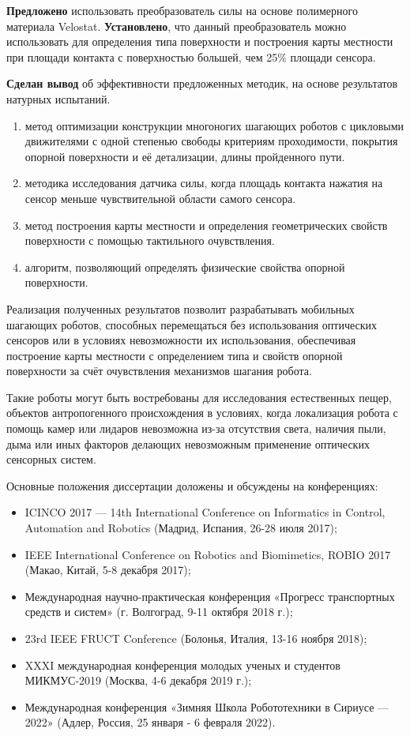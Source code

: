 \textbf{Предложено} использовать преобразователь силы на основе полимерного материала Velostat. \textbf{Установлено}, что данный преобразователь можно использовать для определения типа поверхности и построения карты местности при площади контакта с поверхностью большей, чем 25\% площади сенсора. 

\textbf{Сделан вывод} об эффективности предложенных методик, на основе результатов натурных испытаний.

{}
\begin{enumerate}[beginpenalty=10000] %
    \item метод оптимизации конструкции многоногих шагающих роботов с цикловыми движителями с одной степенью свободы критериям проходимости, покрытия опорной поверхности и её детализации, длины пройденного пути.
    \item методика исследования датчика силы, когда площадь контакта нажатия на сенсор меньше чувствительной области самого сенсора.
  \item  метод построения карты местности и определения геометрических свойств поверхности с помощью тактильного очувствления.
  \item алгоритм, позволяющий определять физические свойства опорной поверхности.
\end{enumerate}


{\influence} Реализация полученных результатов позволит разрабатывать мобильных шагающих роботов, способных перемещаться без использования оптических сенсоров или в условиях невозможности их использования, обеспечивая построение карты местности с определением типа и свойств опорной поверхности за счёт очувствления механизмов шагания робота. 

Такие роботы могут быть востребованы для исследования естественных пещер, объектов антропогенного происхождения в условиях, когда локализация робота с помощь камер или лидаров невозможна из-за отсутствия света, наличия пыли, дыма или иных факторов делающих невозможным применение оптических сенсорных систем.


{\probation}
Основные положения диссертации доложены и обсуждены на конференциях:
\begin{itemize}
  \item ICINCO 2017 — 14th International Conference on Informatics in Control, Automation and Robotics (Мадрид, Испания, 26-28 июля 2017);
  \item IEEE International Conference on Robotics and Biomimetics, ROBIO 2017 (Макао, Китай, 5-8 декабря 2017);
  \item  Международная научно-практическая конференция «Прогресс транспортных средств и систем» (г. Волгоград, 9-11 октября 2018 г.);
  \item 23rd IEEE FRUCT Conference (Болонья, Италия, 13-16 ноября 2018);
  \item XXXI международная конференция молодых ученых и студентов МИКМУС-2019 (Москва, 4-6 декабря 2019 г.);
  \item Международная конференция «Зимняя Школа Робототехники в Сириусе — 2022» (Адлер, Россия, 25 января - 6 февраля 2022).
\end{itemize}

